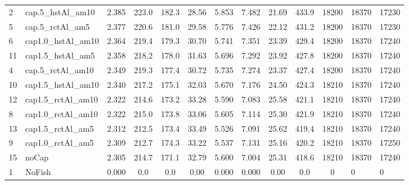 \documentclass[11pt]{book}
\begin{document}
\begin{landscape}
\begin{longtable}[t]{llcccccccccll}
2 & cap.5\_hstAl\_am10 & 2.385 & 223.0 & 182.3 & 28.56 & 5.853 & 7.482 & 21.69 & 433.9 & 18200 & 18370 & 17230\\
5 & cap.5\_rctAl\_am5 & 2.377 & 220.6 & 181.0 & 29.58 & 5.776 & 7.426 & 22.12 & 431.2 & 18200 & 18370 & 17230\\
6 & cap1.0\_hstAl\_am10 & 2.364 & 219.4 & 179.3 & 30.70 & 5.741 & 7.351 & 23.39 & 429.4 & 18200 & 18370 & 17240\\
11 & cap1.5\_hstAl\_am5 & 2.358 & 218.2 & 178.0 & 31.63 & 5.696 & 7.292 & 23.92 & 427.8 & 18200 & 18370 & 17240\\
4 & cap.5\_rctAl\_am10 & 2.349 & 219.3 & 177.4 & 30.72 & 5.735 & 7.274 & 23.37 & 427.4 & 18200 & 18370 & 17240\\
10 & cap1.5\_hstAl\_am10 & 2.340 & 217.2 & 175.1 & 32.03 & 5.670 & 7.176 & 24.50 & 424.3 & 18210 & 18370 & 17240\\
12 & cap1.5\_rctAl\_am10 & 2.322 & 214.6 & 173.2 & 33.28 & 5.590 & 7.083 & 25.58 & 421.1 & 18210 & 18370 & 17240\\
8 & cap1.0\_rctAl\_am10 & 2.322 & 215.0 & 173.8 & 33.06 & 5.605 & 7.114 & 25.30 & 421.9 & 18210 & 18370 & 17240\\
13 & cap1.5\_rctAl\_am5 & 2.312 & 212.5 & 173.4 & 33.49 & 5.526 & 7.091 & 25.62 & 419.4 & 18210 & 18370 & 17240\\
9 & cap1.0\_rctAl\_am5 & 2.309 & 212.7 & 174.3 & 33.22 & 5.537 & 7.131 & 25.16 & 420.2 & 18210 & 18370 & 17250\\
15 & noCap & 2.305 & 214.7 & 171.1 & 32.79 & 5.600 & 7.004 & 25.31 & 418.6 & 18210 & 18370 & 17240\\
1 & NoFish & 0.000 & 0.0 & 0.0 & 0.00 & 0.000 & 0.000 & 0.00 & 0.0 & 0 & 0 & 0\\*
\end{longtable}
\end{landscape}
\endgroup{}

\newpage
\end{document}
